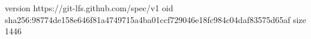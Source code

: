version https://git-lfs.github.com/spec/v1
oid sha256:98774de158e646f81a4749715a4ba01ccf729046e18fc984c04daf83575d65af
size 1446
